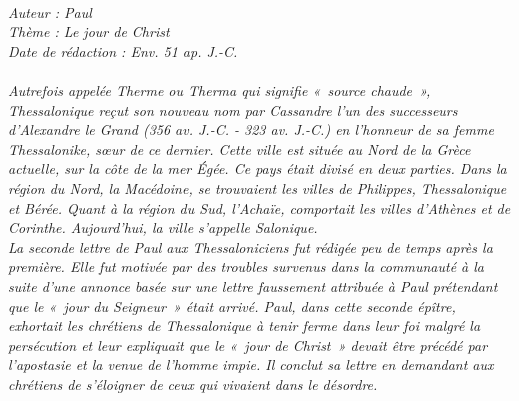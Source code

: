 \BFont
\noindent\hrulefill
{\footnotesize
\textit{
\bigskip
{\centering{}
\\Auteur : Paul
\\Thème : Le jour de Christ
\\Date de rédaction : Env. 51 ap. J.-C.\\}
}
\textit{
\\Autrefois appelée Therme ou Therma qui signifie « source chaude », Thessalonique reçut son nouveau nom par  Cassandre l’un des successeurs  d’Alexandre le Grand (356 av. J.-C. - 323 av. J.-C.) en l’honneur de sa femme Thessalonike, sœur  de ce dernier. Cette ville est située au Nord de la Grèce actuelle, sur la côte de la mer Égée. Ce pays était divisé en deux parties. Dans la région du Nord, la Macédoine, se trouvaient les villes de Philippes, Thessalonique et Bérée. Quant à la région du Sud, l’Achaïe, comportait les villes d’Athènes et de Corinthe. Aujourd’hui, la ville s’appelle Salonique.
\\La seconde lettre de Paul aux Thessaloniciens fut rédigée peu de temps après la première. Elle fut motivée par des troubles survenus dans la communauté à la suite d'une annonce basée sur une lettre faussement attribuée à Paul prétendant que le «~jour du Seigneur~» était arrivé. Paul, dans cette seconde épître, exhortait les chrétiens de Thessalonique à tenir ferme dans leur foi malgré la persécution et leur expliquait que le « jour de Christ » devait être précédé par l’apostasie et la venue de l’homme impie. Il conclut sa lettre en demandant aux chrétiens de s’éloigner de ceux qui vivaient dans le désordre.\bigskip
}
}
\par\nobreak\noindent\hrulefill
